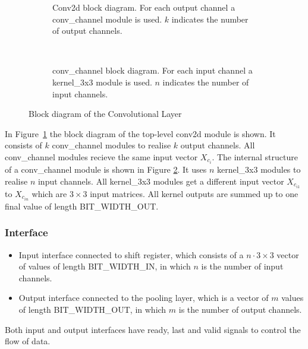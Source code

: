 \begin{figure}[h]
	\centering
	\begin{subfigure}[t]{0.5\textwidth}
		\centering
		
		\caption[Conv2d block diagram.]{Conv2d block diagram. For each output channel a conv\_channel module is used. $k$ indicates the number of output channels.}
		\label{fig:conv2d}
	\end{subfigure}%
	~
	\begin{subfigure}[t]{0.5\textwidth}
		\centering
		
		\caption[conv\_channel block diagram.]{conv\_channel block diagram. For each input channel a kernel\_3x3 module is used. $n$ indicates the number of input channels.}
		\label{fig:conv-channel}		
	\end{subfigure}
	\caption{Block diagram of the Convolutional Layer}
	\label{fig:hw-layer-conv}
\end{figure}


In Figure~\ref{fig:conv2d} the block diagram of the top-level conv2d module is shown. It consists of $k$ conv\_channel modules to realise $k$ output channels. All conv\_channel modules recieve the same input vector $X_{c_i}$. 
The internal structure of a conv\_channel module is shown in Figure \ref{fig:conv-channel}. It uses $n$ kernel\_3x3 modules to realise $n$ input channels. All kernel\_3x3 modules get a different input vector $X_{c_{i1}}$ to $X_{c_{in}}$ which are $3 \times 3$ input matrices. All kernel outputs are summed up to one final value of length BIT\_WIDTH\_OUT.

\subsubsection{Interface}

\begin{itemize}
	\item Input interface connected to shift register, which consists of a $n \cdot 3 \times 3$ vector of values of length BIT\_WIDTH\_IN, in which $n$ is the number of input channels.
	\item Output interface connected to the pooling layer, which is a vector of $m$ values of length BIT\_WIDTH\_OUT, in which $m$ is the number of output channels.
\end{itemize}
Both input and output interfaces have ready, last and valid signals to control the flow of data.

